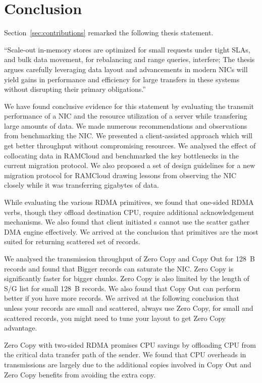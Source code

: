 
\chapter{Conclusion}
\label{chap:conclusion}
Section~\ref{sec:contributions} remarked the following thesis statement.

``Scale-out in-memory stores are optimized for small requests
under tight SLAs, and bulk data movement, for rebalancing and range queries, interfere;
The thesis argues \linebreak carefully leveraging data layout and advancements in modern NICs
will yield gains in performance and efficiency for large transfers in these systems
without disrupting their primary obligations.''
 

We have found conclusive evidence for this statement by evaluating the transmit performance 
of a NIC and the resource utilization of a server while transfering large amounts of data. We 
made numerous recommendations and observations from benchmarking the NIC. We presented a client-assisted 
approach which will get better throughput without compromising resources. We analysed the effect of collocating
data in RAMCloud and benchmarked the key bottlenecks in the current migration protocol. We also proposed a set of design 
guidelines for a new migration protocol for RAMCloud drawing lessons from observing the NIC closely while it was 
transferring gigabytes of data. 

While evaluating the various RDMA primitives, we found that one-sided RDMA verbs, though they offload destination CPU, 
require additional acknowledgement mechanisms. We also found that client initiated s cannot use the 
scatter gather DMA engine effectively. We arrived at the conclusion that  primitives 
are the most suited for returning scattered set of records.

We analysed the transmission throughput of Zero Copy and Copy Out for 128~B records and found that Bigger records can saturate the NIC.
Zero Copy is significantly faster for bigger chunks. Zero Copy is also limited by the length of S/G list for small 128~B records.
We also found that Copy Out can perform better if you have more records. We arrived at the following conclusion that 
unless your records are small and scattered, always use Zero Copy, for small and scattered records, you might need to tune your layout 
to get Zero Copy advantage.

Zero Copy with two-sided RDMA promises CPU savings by offloading CPU from the critical data transfer path of the sender. We found that 
CPU overheads in transmissions are largely due to the additional copies involved in Copy Out and Zero Copy benefits from avoiding the extra copy.
 
